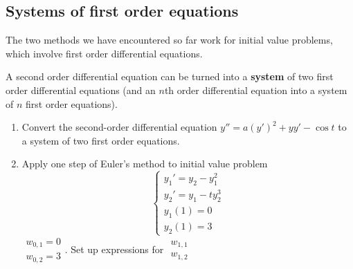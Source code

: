 \documentclass[12pt,letterpaper,noanswers]{exam}
\begin{document}
\subsection*{Systems of first order equations}
\begin{tcolorbox}
The two methods we have encountered so far work for initial value problems, which involve first order differential equations.

A second order differential equation can be turned into a \textbf{system} of two first order differential equations (and an $n$th order differential equation into  a system of $n$ first order equations).
\end{tcolorbox}
\begin{enumerate}[resume]
\item Convert the second-order differential equation $y'' = a(y')^2 +yy' - \cos t$ to a system of two first order equations.
\item Apply one step of Euler's method to initial value problem \[\left\{\begin{array}{l}
y_1' = y_2 - y_1^2 \\
y_2' = y_1 -ty_2^3 \\
y_1(1) = 0 \\
y_2(1) = 3 \end{array}\right.\]
$\begin{array}{l}
w_{0,1} = 0\\
w_{0,2} = 3
\end{array}$. Set up expressions for $\begin{array}{l}
w_{1,1}\\
w_{1,2}
\end{array}$
\vspace{1in}
\end{enumerate}
\end{document}
